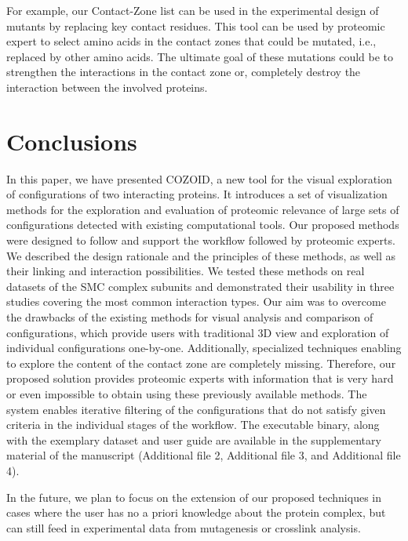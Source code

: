 \documentclass[twocolumn]{bmcart}%
\def\CoZoList{Contact-Zone list\xspace}
\begin{document}
For example, our \CoZoList can be used in the experimental design of mutants by replacing key contact residues. 
This tool can be used by proteomic expert to select amino acids in the contact zones that could be mutated, i.e., replaced by other amino acids.
The ultimate goal of these mutations could be to strengthen the interactions in the contact zone or, completely destroy the interaction between the involved proteins. 

\section*{Conclusions}
In this paper, we have presented COZOID, a new tool for the visual exploration of configurations of two interacting proteins. 
It introduces a set of visualization methods for the exploration and evaluation of proteomic relevance of large sets of configurations detected with existing computational tools.
Our proposed methods were designed to follow and support the workflow followed by proteomic experts.
We described the design rationale and the principles of these methods, as well as their linking and interaction possibilities. 
We tested these methods on real datasets of the SMC complex subunits and demonstrated their usability in three studies covering the most common interaction types.
Our aim was to overcome the drawbacks of the existing methods for visual analysis and comparison of configurations, which provide users with traditional 3D view and exploration of individual configurations one-by-one.
Additionally, specialized techniques enabling to explore the content of the contact zone are completely missing. 
Therefore, our proposed solution provides proteomic experts with information that is very hard or even impossible to obtain using these previously available methods.
The system enables iterative filtering of the configurations that do not satisfy given criteria in the individual stages of the workflow.
The executable binary, along with the exemplary dataset and user guide are available in the supplementary material of the manuscript (Additional file 2, Additional file 3, and Additional file 4).

In the future, we plan to focus on the extension of our proposed techniques in cases where the user has no a priori knowledge about the protein complex, but can still feed in experimental data from mutagenesis or crosslink analysis.

\end{document}

